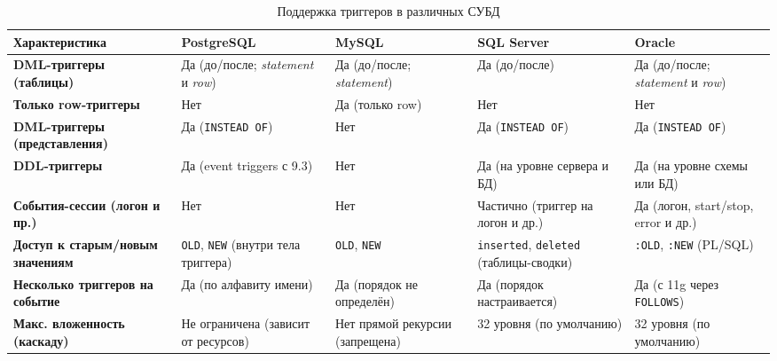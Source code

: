 \begin{table}[H]
    \centering
    \renewcommand{\arraystretch}{1.2} 
    \begin{tabular}{|>{\raggedright\arraybackslash}p{3.5cm} | p{3.2cm} | p{3cm} | p{3cm} | p{3cm}|}
        \hline
        \textbf{Характеристика} & \textbf{PostgreSQL} & \textbf{MySQL} & \textbf{SQL Server} & \textbf{Oracle} \\
        \hline
        \textbf{DML-триггеры (таблицы)} & Да (до/после; \textit{statement} и \textit{row}) & Да (до/после; \textit{statement}) & Да (до/после) & Да (до/после; \textit{statement} и \textit{row}) \\
        \hline
        \textbf{Только row-триггеры} & Нет & Да (только row) & Нет & Нет \\
        \hline
        \textbf{DML-триггеры (представления)} & Да (\texttt{INSTEAD OF}) & Нет & Да (\texttt{INSTEAD OF}) & Да (\texttt{INSTEAD OF}) \\
        \hline
        \textbf{DDL-триггеры} & Да (event triggers с 9.3) & Нет & Да (на уровне сервера и БД) & Да (на уровне схемы или БД) \\
        \hline
        \textbf{События-сессии (логон и пр.)} & Нет & Нет & Частично (триггер на логон и др.) & Да (логон, start/stop, error и др.) \\
        \hline
        \textbf{Доступ к старым/новым значениям} & \texttt{OLD}, \texttt{NEW} (внутри тела триггера) & \texttt{OLD}, \texttt{NEW} & \texttt{inserted}, \texttt{deleted} (таблицы-сводки) & \texttt{:OLD}, \texttt{:NEW} (PL/SQL) \\
        \hline
        \textbf{Несколько триггеров на событие} & Да (по алфавиту имени) \autocite{Postgresqlcom} & Да (порядок не определён) \autocite{Mysqldoc5} & Да (порядок настраивается) \autocite{MicrosoftLearnDDLTrig} & Да (с 11g через \texttt{FOLLOWS}) \autocite{oracledbdoc8} \\
        \hline
        \textbf{Макс. вложенность (каскаду)} & Не ограничена (зависит от ресурсов) \autocite{Postgresqltrig} & Нет прямой рекурсии (запрещена) & 32 уровня (по умолчанию) \autocite{MicrosoftLearnNestTrig} & 32 уровня (по умолчанию) \\
        \hline
    \end{tabular}
    \caption{Поддержка триггеров в различных СУБД}
    \label{tab:trig-comp}
\end{table}


\vspace{0.5em}

